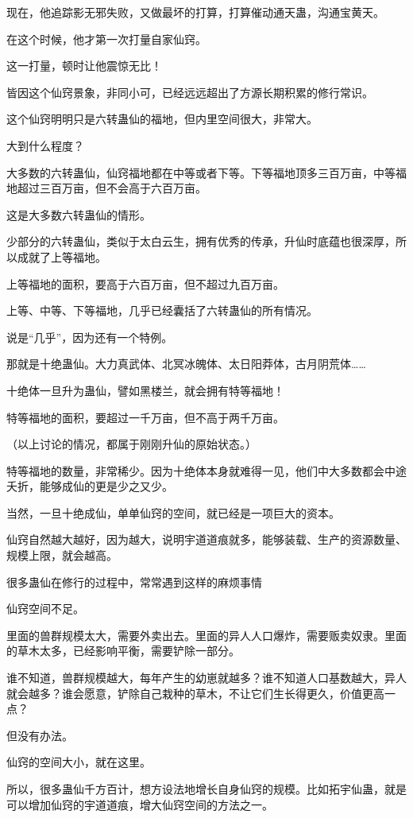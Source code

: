 \begin{this_body}
现在，他追踪影无邪失败，又做最坏的打算，打算催动通天蛊，沟通宝黄天。

在这个时候，他才第一次打量自家仙窍。

这一打量，顿时让他震惊无比！

皆因这个仙窍景象，非同小可，已经远远超出了方源长期积累的修行常识。

这个仙窍明明只是六转蛊仙的福地，但内里空间很大，非常大。

大到什么程度？

大多数的六转蛊仙，仙窍福地都在中等或者下等。下等福地顶多三百万亩，中等福地超过三百万亩，但不会高于六百万亩。

这是大多数六转蛊仙的情形。

少部分的六转蛊仙，类似于太白云生，拥有优秀的传承，升仙时底蕴也很深厚，所以成就了上等福地。

上等福地的面积，要高于六百万亩，但不超过九百万亩。

上等、中等、下等福地，几乎已经囊括了六转蛊仙的所有情况。

说是“几乎”，因为还有一个特例。

那就是十绝蛊仙。大力真武体、北冥冰魄体、太日阳莽体，古月阴荒体……

十绝体一旦升为蛊仙，譬如黑楼兰，就会拥有特等福地！

特等福地的面积，要超过一千万亩，但不高于两千万亩。

（以上讨论的情况，都属于刚刚升仙的原始状态。）

特等福地的数量，非常稀少。因为十绝体本身就难得一见，他们中大多数都会中途夭折，能够成仙的更是少之又少。

当然，一旦十绝成仙，单单仙窍的空间，就已经是一项巨大的资本。

仙窍自然越大越好，因为越大，说明宇道道痕就多，能够装载、生产的资源数量、规模上限，就会越高。

很多蛊仙在修行的过程中，常常遇到这样的麻烦事情

仙窍空间不足。

里面的兽群规模太大，需要外卖出去。里面的异人人口爆炸，需要贩卖奴隶。里面的草木太多，已经影响平衡，需要铲除一部分。

谁不知道，兽群规模越大，每年产生的幼崽就越多？谁不知道人口基数越大，异人就会越多？谁会愿意，铲除自己栽种的草木，不让它们生长得更久，价值更高一点？

但没有办法。

仙窍的空间大小，就在这里。

所以，很多蛊仙千方百计，想方设法地增长自身仙窍的规模。比如拓宇仙蛊，就是可以增加仙窍的宇道道痕，增大仙窍空间的方法之一。

\end{this_body}

